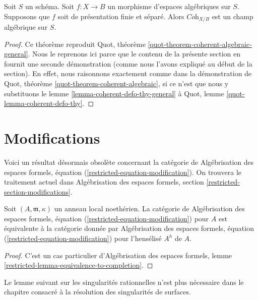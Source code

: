 \begin{theorem}
\label{theorem-coherent-algebraic-general}
Soit $S$ un schéma. Soit $f : X \to B$ un morphisme d'espaces algébriques
sur $S$. Supposons que $f$ soit de présentation finie et séparé. Alors
$\textit{Coh}_{X/B}$ est un champ algébrique sur $S$.
\end{theorem}

\begin{proof}
Ce théorème reproduit Quot, théorème
\ref{quot-theorem-coherent-algebraic-general}.
Nous le reprenons ici parce que le contenu de la présente section en fournit
une seconde démonstration (comme nous l'avons expliqué au début de la section).
En effet, nous raisonnons exactement comme dans la démonstration de
Quot, théorème \ref{quot-theorem-coherent-algebraic},
si ce n'est que nous y substituons
le lemme \ref{lemma-coherent-defo-thy-general} à
Quot, lemme \ref{quot-lemma-coherent-defo-thy}.
\end{proof}




\section{Modifications}
\label{section-modifications}

\noindent
Voici un résultat désormais obsolète concernant la catégorie de
Algébrisation des espaces formels, équation
(\ref{restricted-equation-modification}).
On trouvera le traitement actuel dans Algébrisation des espaces formels,
section \ref{restricted-section-modifications}.

\begin{lemma}
\label{lemma-henselian}
Soit $(A, \mathfrak m, \kappa)$ un anneau local noethérien.
La catégorie de
Algébrisation des espaces formels, équation
(\ref{restricted-equation-modification})
pour $A$ est équivalente à la catégorie donnée par
Algébrisation des espaces formels, équation
(\ref{restricted-equation-modification})
pour l'hensélisé $A^h$ de $A$.
\end{lemma}

\begin{proof}
C'est un cas particulier d'Algébrisation des espaces formels, lemme
\ref{restricted-lemma-equivalence-to-completion}.
\end{proof}

\noindent
Le lemme suivant sur les singularités rationnelles n'est plus nécessaire
dans le chapitre consacré à la résolution des singularités de surfaces.

